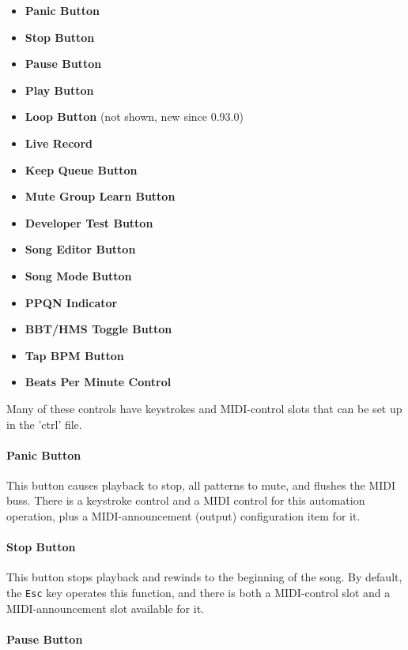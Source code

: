 \documentclass[
 11pt,
 twoside,
 a4paper,
 final                                 %
]{article}
\begin{document}
   \begin{itemize}
      \item \textbf{Panic Button}
      \item \textbf{Stop Button}
      \item \textbf{Pause Button}
      \item \textbf{Play Button}
      \item \textbf{Loop Button} (not shown, new since 0.93.0)
      \item \textbf{Live Record}
      \item \textbf{Keep Queue Button}
      \item \textbf{Mute Group Learn Button}
      \item \textbf{Developer Test Button}
      \item \textbf{Song Editor Button}
      \item \textbf{Song Mode Button}
      \item \textbf{PPQN Indicator}
      \item \textbf{BBT/HMS Toggle Button}
      \item \textbf{Tap BPM Button}
      \item \textbf{Beats Per Minute Control}
   \end{itemize}

   Many of these controls have keystrokes and MIDI-control slots that can be
   set up in the 'ctrl' file.

\paragraph{Panic Button}
\label{paragraph:introduction_panic_button}

   This button causes playback to stop, all patterns to mute, and flushes the
   MIDI buss.
   There is a keystroke control and a MIDI control
   for this automation operation, plus
   a MIDI-announcement (output) configuration item for it.

\paragraph{Stop Button}
\label{paragraph:introduction_stop_button}

   This button stops playback and rewinds to the beginning of the song.
   By default, the \texttt{Esc} key operates this function,
   and there is both a MIDI-control slot and a MIDI-announcement slot
   available for it.

\paragraph{Pause Button}
\label{paragraph:introduction_pause_button}
\end{document}
